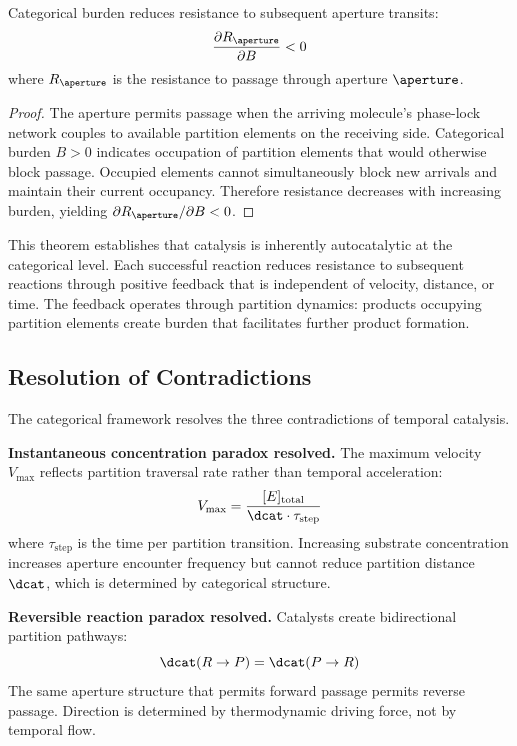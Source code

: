 \begin{theorem}
\label{thm:autocatalysis}
Categorical burden reduces resistance to subsequent aperture transits:
\begin{equation}
\frac{\partial R_{\aperture}}{\partial B} < 0
\end{equation}
where $R_{\aperture}$ is the resistance to passage through aperture $\aperture$.
\end{theorem}

\begin{proof}
The aperture permits passage when the arriving molecule's phase-lock network couples to available partition elements on the receiving side. Categorical burden $B > 0$ indicates occupation of partition elements that would otherwise block passage. Occupied elements cannot simultaneously block new arrivals and maintain their current occupancy. Therefore resistance decreases with increasing burden, yielding $\partial R_{\aperture}/\partial B < 0$.
\end{proof}

This theorem establishes that catalysis is inherently autocatalytic at the categorical level. Each successful reaction reduces resistance to subsequent reactions through positive feedback that is independent of velocity, distance, or time. The feedback operates through partition dynamics: products occupying partition elements create burden that facilitates further product formation.

\subsection{Resolution of Contradictions}

The categorical framework resolves the three contradictions of temporal catalysis.

\textbf{Instantaneous concentration paradox resolved.} The maximum velocity $V_{\max}$ reflects partition traversal rate rather than temporal acceleration:
\begin{equation}
V_{\max} = \frac{[E]_{\mathrm{total}}}{\dcat \cdot \tau_{\mathrm{step}}}
\end{equation}
where $\tau_{\mathrm{step}}$ is the time per partition transition. Increasing substrate concentration increases aperture encounter frequency but cannot reduce partition distance $\dcat$, which is determined by categorical structure.

\textbf{Reversible reaction paradox resolved.} Catalysts create bidirectional partition pathways:
\begin{equation}
\dcat(R \to P) = \dcat(P \to R)
\end{equation}
The same aperture structure that permits forward passage permits reverse passage. Direction is determined by thermodynamic driving force, not by temporal flow.


